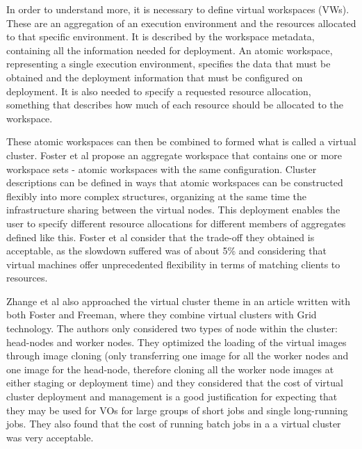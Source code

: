 In order to understand more, it is necessary to define virtual workspaces (VWs). These are an aggregation of an execution environment and the resources allocated to that specific environment. It is described by the workspace metadata, containing all the information needed for deployment. An atomic workspace, representing a single execution environment, specifies the data that must be obtained and the deployment information that must be configured on deployment. It is also needed to specify a requested resource allocation, something that describes how much of each resource should be allocated to the workspace.

These atomic workspaces can then be combined to formed what is called a virtual cluster. Foster et al propose an aggregate workspace that contains one or more workspace sets - atomic workspaces with the same configuration. Cluster descriptions can be defined in ways that atomic workspaces can be constructed flexibly into more complex structures, organizing at the same time the infrastructure sharing between the virtual nodes. This deployment enables the user to specify different resource allocations for different members of aggregates defined like this. Foster et al consider that the trade-off they obtained is acceptable, as the slowdown suffered was of about 5\% and considering that virtual machines offer unprecedented flexibility in terms of matching clients to resources. \cite{clusters-grid}

Zhange et al also approached the virtual cluster theme in an article written with both Foster and Freeman, where they combine virtual clusters with Grid technology. The authors only considered two types of node within the cluster: head-nodes and worker nodes. They optimized the loading of the virtual images through image cloning (only transferring one image for all the worker nodes and one image for the head-node, therefore cloning all the worker node images at either staging or deployment time) and they considered that the cost of virtual cluster deployment and management is a good justification for expecting that they may be used for VOs for large groups of short jobs and single long-running jobs. They also found that the cost of running batch jobs in a a virtual cluster was very acceptable.\cite{Zhang05virtualcluster}

